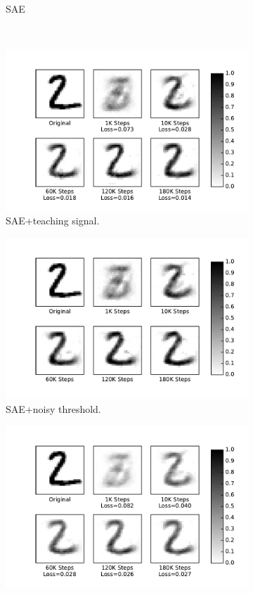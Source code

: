 \begin{figure}
\begin{subfigure}[t]{0.32\textwidth}
		\caption{SAE}
	\end{subfigure}\\
	\begin{subfigure}[t]{0.32\textwidth}
		\includegraphics[width=\textwidth]{pics_sdlm/41_MNIST_SAE_teach/recon_digit.pdf}
		\caption{SAE+teaching signal.}
	\end{subfigure}
	\begin{subfigure}[t]{0.32\textwidth}
		\includegraphics[width=\textwidth]{pics_sdlm/noise_ae/recon_digit.pdf}
		\caption{SAE+noisy threshold.}
	\end{subfigure}
	\begin{subfigure}[t]{0.32\textwidth}
		\includegraphics[width=\textwidth]{pics_sdlm/43_MNIST_SAE_all/recon_digit.pdf}

\end{subfigure}
\end{figure}
